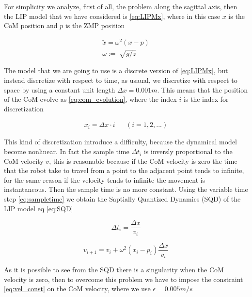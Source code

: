 \documentclass[a4paper]{article}
\begin{document}
For simplicity we analyze, first of all, the problem along the sagittal axis, then the LIP model that we have considered is \ref{eq:LIPMx}, where in this case $x$ is the CoM position and $p$ is the ZMP position

\begin{equation}
\begin{aligned}
\ddot{x} = \omega^2(x-p) \\
\omega := \sqrt[]{g/z}
\end{aligned}
\label{eq:LIPMx}
\end{equation}

The model that we are going to use is a discrete version of \ref{eq:LIPMx}, but instead discretize with respect to time, as usaual, we discretize with respect to space by using a constant unit length $\Delta x=0.001m$. This means that the position of the CoM evolve as \eqref{eq:com_evolution}, where the index $i$ is the index for discretization

\begin{equation}
\begin{aligned}
x_i = \Delta x \cdot i  && (i=1,2,...)
\end{aligned}
\label{eq:com_evolution}
\end{equation}

This kind of discretization introduce a difficulty, because the dynamical model become nonlinear. In fact the sample time $\Delta t_i$ is inversly proportional to the CoM velocity $v$, this is reasonable because if the CoM velocity is zero the time that the robot take to travel from a point to the adjacent point tends to infinite, for the same reason if the velocity tends to infinite the movement is instantaneous. Then the sample time is no more constant. Using the variable time step \ref{eq:sampletime} we obtain the Saptially Quantized Dynamics (SQD) of the LIP model eq \ref{eq:SQD} 

\begin{equation}
\Delta t_i = \frac{\Delta x}{v_i}
\label{eq:sampletime}
\end{equation}

\begin{equation}
v_{i+1} = v_i+\omega^2(x_i-p_i)\frac{\Delta x}{v_i}
\label{eq:SQD}
\end{equation}

As it is possible to see from the SQD there is a singularity when the CoM velocity is zero, then to overcome this problem we have to impose the constraint \ref{eq:vel_const} on the CoM velocity, where we use $\epsilon=0.005m/s$
\end{document}

